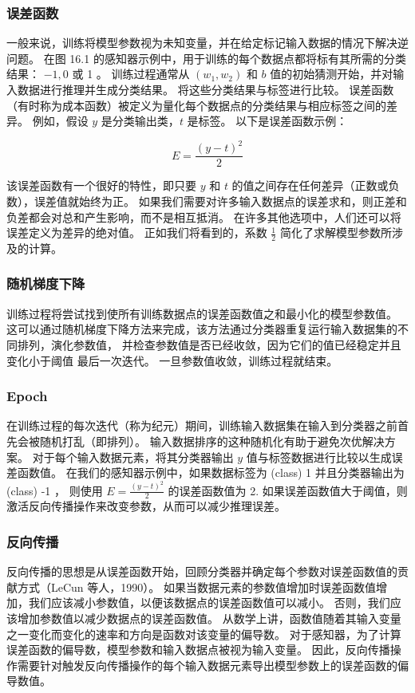 \subsubsection{误差函数}
一般来说，训练将模型参数视为未知变量，并在给定标记输入数据的情况下解决逆问题。 
在图 16.1 的感知器示例中，用于训练的每个数据点都将标有其所需的分类结果： $-1,0$ 或 1 。 
训练过程通常从 $\left(w_{1}, w_{2}\right)$ 和 $b$ 值的初始猜测开始，并对输入数据进行推理并生成分类结果。 
将这些分类结果与标签进行比较。 误差函数（有时称为成本函数）被定义为量化每个数据点的分类结果与相应标签之间的差异。 
例如，假设 $y$ 是分类输出类，$t$ 是标签。 以下是误差函数示例：

$$
E=\frac{(y-t)^{2}}{2}
$$

该误差函数有一个很好的特性，即只要 $y$ 和 $t$ 的值之间存在任何差异（正数或负数），误差值就始终为正。 
如果我们需要对许多输入数据点的误差求和，则正差和负差都会对总和产生影响，而不是相互抵消。 
在许多其他选项中，人们还可以将误差定义为差异的绝对值。 
正如我们将看到的，系数 $\frac{1}{2}$ 简化了求解模型参数所涉及的计算。

\subsubsection{随机梯度下降}
训练过程将尝试找到使所有训练数据点的误差函数值之和最小化的模型参数值。 
这可以通过随机梯度下降方法来完成，该方法通过分类器重复运行输入数据集的不同排列，演化参数值，
并检查参数值是否已经收敛，因为它们的值已经稳定并且变化小于阈值 最后一次迭代。 一旦参数值收敛，训练过程就结束。

\subsubsection{Epoch}
在训练过程的每次迭代（称为纪元）期间，训练输入数据集在输入到分类器之前首先会被随机打乱（即排列）。 
输入数据排序的这种随机化有助于避免次优解决方案。 
对于每个输入数据元素，将其分类器输出 $y$ 值与标签数据进行比较以生成误差函数值。 
在我们的感知器示例中，如果数据标签为 (class) 1 并且分类器输出为 (class) -1 ，
则使用 $E=\frac{(y-t)^{2}}{2}$ 的误差函数值为 2. 
如果误差函数值大于阈值，则激活反向传播操作来改变参数，从而可以减少推理误差。

\subsubsection{反向传播}
反向传播的思想是从误差函数开始，回顾分类器并确定每个参数对误差函数值的贡献方式（LeCun 等人，1990）。 
如果当数据元素的参数值增加时误差函数值增加，我们应该减小参数值，以便该数据点的误差函数值可以减小。 
否则，我们应该增加参数值以减少数据点的误差函数值。 
从数学上讲，函数值随着其输入变量之一变化而变化的速率和方向是函数对该变量的偏导数。 
对于感知器，为了计算误差函数的偏导数，模型参数和输入数据点被视为输入变量。 
因此，反向传播操作需要针对触发反向传播操作的每个输入数据元素导出模型参数上的误差函数的偏导数值。

